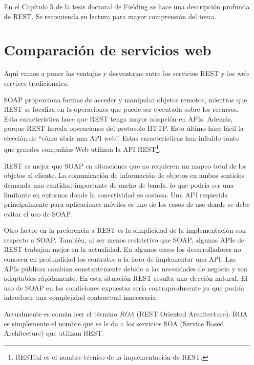 \documentclass[conference]{IEEEtran}
\begin{document}
En el Capítulo 5 \cite{FieldingPhD} de la tesis doctoral de Fielding
se hace una descripción profunda de REST. Se recomienda su lectura
para mayor comprensión del tema.

\section{Comparación de servicios web}
\label{sec:comparacion}

Aquí vamos a poner las ventajas y desventajas entre los servicios REST
y los web services tradicionales.


SOAP proporciona formas de acceder y manipular objetos remotos,
mientras que REST se focaliza en la operaciones que puede ser
ejecutada sobre los recursos. Esta característica hace que REST tenga
mayor adopción en APIs. Además, porque REST hereda operaciones del
protocolo HTTP. Esto último hace fácil la elección de ``cómo abrir una
API web''. Estas características han influido tanto que grandes
compañías Web utilizan la API REST\footnote{RESTful es el nombre
técnico de la implementación de REST.}.

REST es mejor que SOAP en situaciones que no requieren un mapeo total
de los objetos al cliente. La comunicación de información de objetos
en ambos sentidos demanda una cantidad importante de ancho de banda,
lo que podría ser una limitante en entornos donde la conectividad es
costosa. Una API requerida principalmente para aplicaciones móviles es
uno de los casos de uso donde se debe evitar el uso de SOAP.

Otro factor en la preferencia a REST es la simplicidad de la
implementación con respecto a SOAP. También, al ser menos restrictivo
que SOAP, algunas APIs de REST trabajan mejor en la actualidad. En
algunos casos los desarrolladores no conocen en profundidad los
contratos a la hora de implementar una API. Las APIs públicas cambian
constantemente debido a las necesidades de negocio y son adaptables
rápidamente. En esta situación REST resulta una elección
natural. El uso de SOAP en las condiciones expuestas sería
contraproducente ya que podría introducir una complejidad contractual
innecesaria. 

Actualmente es común leer el término \emph{ROA} (REST Oriented
Architecture). ROA es simplemente el nombre que se le da a los
servicios SOA (Service Based Architecture) que utilizan REST.
\end{document}

